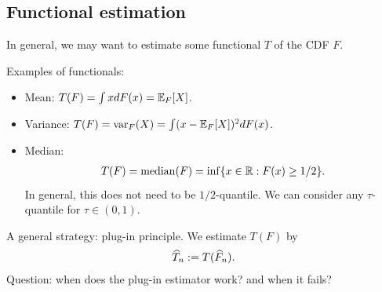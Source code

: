 \documentclass[11pt,letterpaper]{article}
\numberwithin{assumption}{lecture}
\numberwithin{theorem}{lecture}
\numberwithin{proposition}{lecture}
\numberwithin{lemma}{lecture}
\numberwithin{claim}{lecture}
\numberwithin{corollary}{lecture}
\numberwithin{definition}{lecture}
\numberwithin{conjecture}{lecture}
\numberwithin{remark}{lecture}
\numberwithin{example}{lecture}
\numberwithin{equation}{lecture}
\begin{document}
\subsection{Functional estimation}
In general, we may want to estimate some functional $T$ of the CDF $F$.

Examples of functionals:
\begin{itemize}
  \item Mean: $T(F) = \int x dF(x) = {\mathbb{E}}_{F} [X]$.
  \item Variance: $T(F) = \operatorname{var}_F (X) = \int (x - {\mathbb{E}}_F[X])^2 dF(x)$.
  \item Median:
  \begin{align*}
    T(F) = \mathrm{median}(F) = \inf\{x \in \mathbb{R}: F(x) \geq 1/2\}.
  \end{align*}
  In general, this does not need to be $1/2$-quantile. We can consider any $\tau$-quantile for $\tau \in (0,1)$.
\end{itemize}
A general strategy: plug-in principle. We estimate $T(F)$ by
\begin{align*}
  \widehat{T}_n := T(\widehat{F}_n).
\end{align*}
Question: when does the plug-in estimator work? and when it fails?
\end{document}
